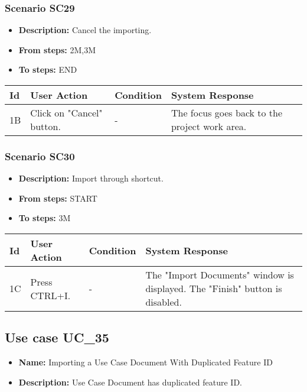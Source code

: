 \documentclass[a4paper,11pt]{article}
\newcommand{\bl}{\\ \hline}
\begin{document}
\subsubsection*{Scenario SC29}
\begin{itemize}
\item {\bf Description:} Cancel the importing.
\item {\bf From steps:} 2M,3M
\item {\bf To steps:} END
\end{itemize}
\begin{tabular}{|p{0.4in}|p{1.5in}|p{1.5in}|p{1.5in}|}
\hline
Id & User Action & Condition & System Response \bl 
1B & Click on "Cancel" button. & - & The focus goes back to the project work area.\bl
\end{tabular}
\subsubsection*{Scenario SC30}
\begin{itemize}
\item {\bf Description:} Import through shortcut.
\item {\bf From steps:} START
\item {\bf To steps:} 3M
\end{itemize}
\begin{tabular}{|p{0.4in}|p{1.5in}|p{1.5in}|p{1.5in}|}
\hline
Id & User Action & Condition & System Response \bl 
1C & Press CTRL+I. & - & The "Import Documents" window is displayed. The "Finish"
						button is disabled.\bl
\end{tabular}
\subsection*{Use case UC_35}
\begin{itemize}
\item {\bf Name: }Importing a Use Case Document With Duplicated Feature ID
\item {\bf Description: }Use Case Document has duplicated feature ID.
			
\end{itemize}
\end{document}
